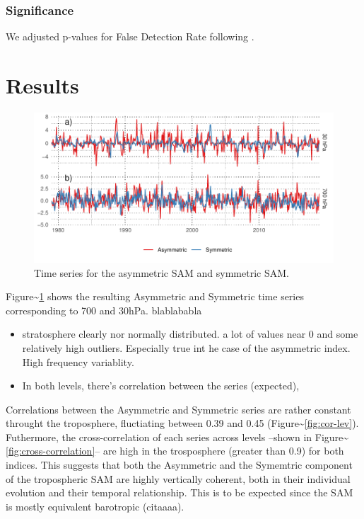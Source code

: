 \documentclass[]{ametsocV5}
\begin{document}
\subsubsection{Significance}

We adjusted p-values for False Detection Rate following
\citet{wilks2016}.

\section{Results}

\begin{figure}
\includegraphics{asymsam-timeseries-1} \caption[Time series for the asymmetric SAM and symmetric SAM]{Time series for the asymmetric SAM and symmetric SAM.}\label{fig:asymsam-timeseries}
\end{figure}

Figure\textasciitilde{}\ref{fig:asymsam-timeseries} shows the resulting
Asymmetric and Symmetric time series corresponding to 700 and 30hPa.
blablababla

\begin{itemize}
\item
  stratosphere clearly nor normally distributed. a lot of values near 0
  and some relatively high outliers. Especially true int he case of the
  asymmetric index. High frequency variablity.
\item
  In both levels, there's correlation between the series (expected),
\end{itemize}

Correlations between the Asymmetric and Symmetric series are rather
constant throught the troposphere, fluctiating between 0.39 and 0.45
(Figure\textasciitilde{}\ref{fig:cor-lev}). Futhermore, the
cross-correlation of each series across levels --shown in
Figure\textasciitilde{}\ref{fig:cross-correlation}-- are high in the
trosposphere (greater than 0.9) for both indices. This suggests that
both the Asymmetric and the Symemtric component of the tropospheric SAM
are highly vertically coherent, both in their individual evolution and
their temporal relationship. This is to be expected since the SAM is
mostly equivalent barotropic (citaaaa).
\end{document}
